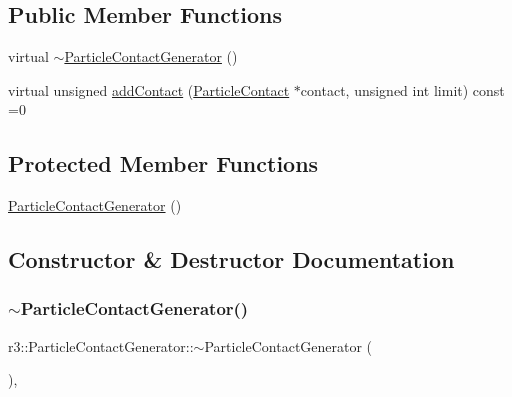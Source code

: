 \subsection*{Public Member Functions}
\begin{DoxyCompactItemize}
\item 
virtual \mbox{\hyperlink{classr3_1_1_particle_contact_generator_af258aa3e7d7fb8e9c9ca7eb545d27738}{$\sim$\+Particle\+Contact\+Generator}} ()
\item 
virtual unsigned \mbox{\hyperlink{classr3_1_1_particle_contact_generator_a3c9c99fb97a4431f0ddf300b30167d03}{add\+Contact}} (\mbox{\hyperlink{classr3_1_1_particle_contact}{Particle\+Contact}} $\ast$contact, unsigned int limit) const =0
\end{DoxyCompactItemize}
\subsection*{Protected Member Functions}
\begin{DoxyCompactItemize}
\item 
\mbox{\hyperlink{classr3_1_1_particle_contact_generator_a3cfeb03fe6fb6a82a64746c0dd9b89f2}{Particle\+Contact\+Generator}} ()
\end{DoxyCompactItemize}


\subsection{Constructor \& Destructor Documentation}
\mbox{\label{classr3_1_1_particle_contact_generator_af258aa3e7d7fb8e9c9ca7eb545d27738}} 
\subsubsection{\texorpdfstring{$\sim$\+Particle\+Contact\+Generator()}{~ParticleContactGenerator()}}
{\footnotesize\ttfamily r3\+::\+Particle\+Contact\+Generator\+::$\sim$\+Particle\+Contact\+Generator (\begin{DoxyParamCaption}{ }\end{DoxyParamCaption})\hspace{0.3cm}{\ttfamily [virtual]}, {\ttfamily [default]}}

